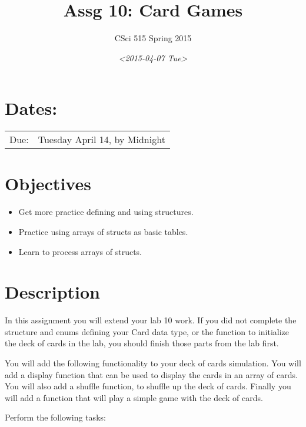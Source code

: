 \documentclass[11pt]{article}
\author{CSci 515 Spring 2015}
\date{\textit{<2015-04-07 Tue>}}
\title{Assg 10: Card Games}
\begin{document}
\maketitle

\section*{Dates:}
\label{sec-1}
\begin{center}
\begin{tabular}{ll}
Due: & Tuesday April 14, by Midnight\\
\end{tabular}
\end{center}
\section*{Objectives}
\label{sec-2}
\begin{itemize}
\item Get more practice defining and using structures.
\item Practice using arrays of structs as basic tables.
\item Learn to process arrays of structs.
\end{itemize}
\section*{Description}
\label{sec-3}
In this assignment you will extend your lab 10 work.  If you did not
complete the structure and enums defining your Card data type, or the
function to initialize the deck of cards in the lab, you should finish
those parts from the lab first.

You will add the following functionality to your deck of cards
simulation.  You will add a display function that can be used to
display the cards in an array of cards.  You will also add a shuffle
function, to shuffle up the deck of cards.  Finally you will add
a function that will play a simple game with the deck of cards.

Perform the following tasks:
\end{document}
